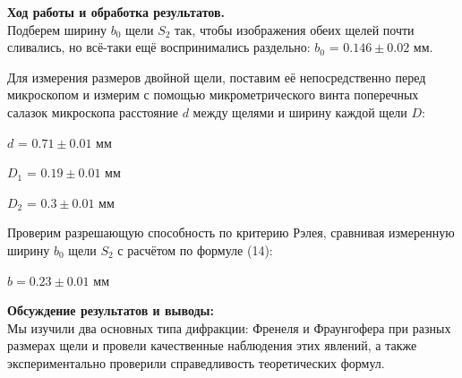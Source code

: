 \documentclass[a4paper, 12pt]{article}%
\begin{document}
\textbf{Ход работы и обработка результатов.}\\

Подберем ширину $b_0$ щели $S_2$ так, чтобы изображения обеих щелей почти сливались,
но всё-таки ещё воспринимались раздельно: $b_0$ = $0.146 \pm 0.02$ мм.

Для измерения размеров двойной щели, поставим её непосредственно перед микроскопом и измерим с помощью микрометрического винта поперечных салазок микроскопа
расстояние $d$ между щелями и ширину каждой щели $D$:

$d$ = $0.71 \pm 0.01$ мм

$D_1$ = $0.19 \pm 0.01$ мм

$D_2$ = $0.3 \pm 0.01$ мм


Проверим разрешающую способность по критерию Рэлея, сравнивая измеренную ширину $b_0$ щели $S_2$ с расчётом по формуле (14):

$b = 0.23 \pm 0.01$ мм

	\textbf{Обсуждение результатов и выводы: }\\
	
Мы изучили два основных типа дифракции: Френеля и Фраунгофера при разных размерах щели и провели качественные наблюдения этих явлений, а также экспериментально проверили справедливость теоретических формул.

	
\end{document}
